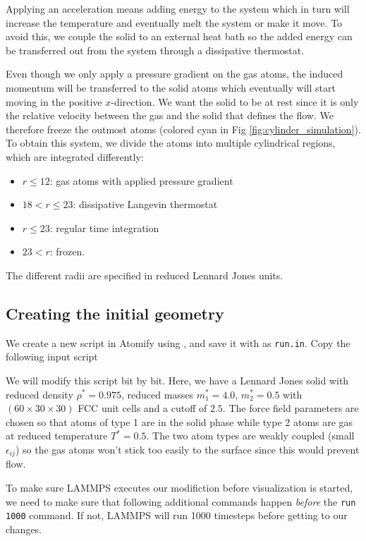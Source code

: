\documentclass[12pt,a4paper,final]{iopart}
\newcommand{\code}[1]{\colorbox{light-gray}{\color{RawSienna}\texttt{#1}}}
\begin{document}
Applying an acceleration means adding energy to the system which in turn will increase the temperature and eventually melt the system or make it move.
To avoid this, we couple the solid to an external heat bath so the added energy can be transferred out from the system through a dissipative thermostat.

Even though we only apply a pressure gradient on the gas atoms, the induced momentum will be transferred
to the solid atoms which eventually will start moving in the positive $x$-direction.
We want the solid to be at rest since it is only the relative velocity between the gas and the solid that defines
the flow. We therefore freeze the outmost atoms (colored cyan in Fig \ref{fig:cylinder_simulation}).
To obtain this system, we divide the atoms into multiple cylindrical regions, which are integrated differently:

\begin{itemize}
	\item $r \leq 12$: gas atoms with applied pressure gradient
	\item $18 < r \leq 23$: dissipative Langevin thermostat
	\item $r \leq 23$: regular time integration
	\item $23 < r$: frozen.
\end{itemize}
The different radii are specified in reduced Lennard Jones units.

\subsection{Creating the initial geometry}
We create a new script in Atomify using , and save it with  as \code{run.in}.
Copy the following input script



We will modify this script bit by bit.
Here, we have a Lennard Jones solid with reduced density
$\rho^* = 0.975$, reduced masses $m_1^* = 4.0$, $m_2^* = 0.5$ with $(60\times30\times30)$
FCC unit cells and a cutoff of $2.5$. 
The force field parameters are chosen so that atoms of type 1
are in the solid phase while type 2 atoms are gas at reduced temperature $T^*=0.5$.
The two atom types are weakly coupled (small $\epsilon_{ij}$) so the gas atoms won't
stick too easily to the surface since this would prevent flow.

To make sure LAMMPS executes our modifiction before visualization is started,
we need to make sure that following additional commands happen \textit{before} the \code{run 1000} command.
If not, LAMMPS will run 1000 timesteps before getting to our changes.
\end{document}
